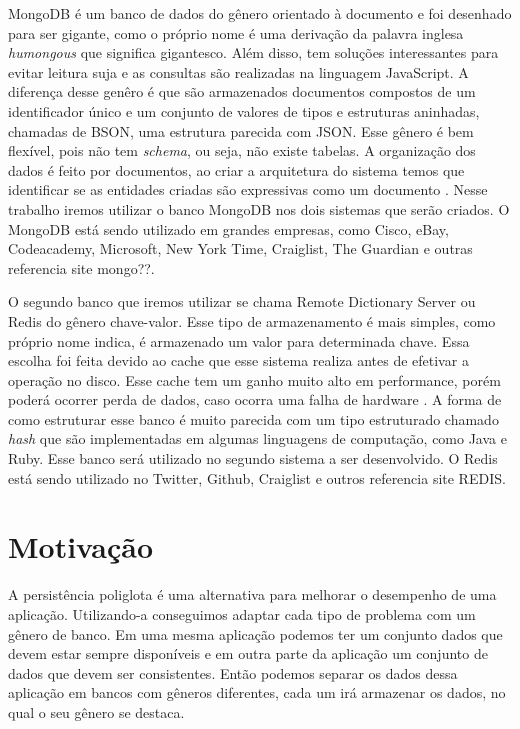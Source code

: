 MongoDB é um banco de dados do gênero orientado à documento e foi desenhado para ser gigante, como o próprio nome é uma derivação da palavra inglesa \textit{humongous} que significa gigantesco. Além disso, tem soluções interessantes para evitar leitura suja e as consultas são realizadas na linguagem JavaScript. A diferença desse genêro é que são armazenados documentos compostos de um identificador único e um conjunto de valores de tipos e estruturas aninhadas, chamadas de BSON, uma estrutura parecida com JSON. Esse gênero é bem flexível, pois não tem \textit{schema}, ou seja, não existe tabelas. A organização dos dados é feito por documentos, ao criar a arquitetura do sistema temos que identificar se as entidades criadas são expressivas como um documento \cite{SDSW}. Nesse trabalho iremos utilizar o banco MongoDB nos dois sistemas que serão criados. O MongoDB está sendo utilizado em grandes empresas, como Cisco, eBay, Codeacademy, Microsoft, New York Time, Craiglist, The Guardian e outras referencia site mongo??.

O segundo banco que iremos utilizar se chama Remote Dictionary Server ou Redis do gênero chave-valor. Esse tipo de armazenamento é mais simples, como próprio nome indica, é armazenado um valor para determinada chave. Essa escolha foi feita devido ao cache que esse sistema realiza antes de efetivar a operação no disco. Esse cache tem um ganho muito alto em performance, porém poderá ocorrer perda de dados, caso ocorra uma falha de hardware \cite{SDSW}. A forma de como estruturar esse banco é muito parecida com um tipo estruturado chamado \textit{hash} que são implementadas em algumas linguagens de computação, como Java e Ruby. Esse banco será utilizado no segundo sistema a ser desenvolvido. O Redis está sendo utilizado no Twitter, Github, Craiglist e outros referencia site REDIS.


\section{Motivação}
\label{sec:motivacao}
A persistência poliglota é uma alternativa para melhorar o desempenho de uma aplicação. Utilizando-a conseguimos adaptar cada tipo de problema com um gênero de banco.  Em uma mesma aplicação podemos ter um conjunto dados que devem estar sempre disponíveis e em outra parte da aplicação um conjunto de dados que devem ser consistentes. Então podemos separar os dados dessa aplicação em bancos com gêneros diferentes, cada um irá armazenar os dados, no qual o seu gênero se destaca.








